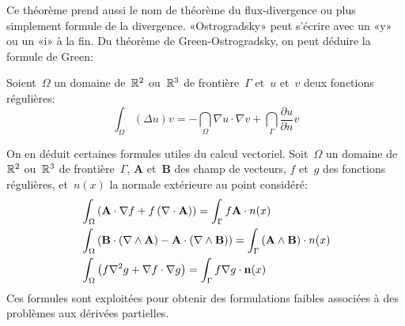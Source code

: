 \medskip
Ce théorème prend aussi le nom de théorème du flux-divergence ou plus simplement formule de la
divergence. «Ostrogradsky» peut s'écrire avec un «y» ou un «i» à la fin. Du théorème de Green-Ostrogradsky, on peut déduire la formule de Green:

\begin{theoreme}
Soient~$\Omega$ un domaine de~$\mathbb R^2$ ou~$\mathbb R^3$ de frontière~$\Gamma$
et~$u$ et~$v$ deux fonctions régulières:
\begin{equation}
\int_\Omega (\Delta u)v = -\dint_\Omega \nabla u\cdot\nabla v + \dint_\Gamma \dfrac{\partial u}{\partial n}v
\end{equation}
\end{theoreme}

\medskip
On en déduit certaines formules utiles du calcul vectoriel.
Soit~$\Omega$ un domaine de~$\mathbb R^2$ ou~$\mathbb R^3$ de frontière~$\Gamma$,
$\mathbf{A}$ et~$\mathbf{B}$ des champ de vecteurs, $f$ et~$g$ des
fonctions régulières, et~$n(x)$ la normale extérieure au point considéré:
\begin{align}
  &\int_\Omega \left( \mathbf{A}\cdot \nabla f + f \left(\nabla \cdot \mathbf{A}\right)\right)=
  \int_\Gamma f \mathbf{A}\cdot n(x)\\
&\int_\Omega \left( \mathbf{B}\cdot\left(\nabla \wedge \mathbf{A}\right) - \mathbf{A}\cdot \left(\nabla
\wedge \mathbf{B}\right) \right)
= \int_\Gamma \left(\mathbf{A} \wedge \mathbf{B}\right)\cdot n(x)\\
&\int_\Omega \left( f \nabla^{2} g + \nabla f \cdot \nabla g \right)
= \int_\Gamma f \nabla g \cdot \mathbf{n}(x)
\end{align}
Ces formules sont exploitées pour obtenir des formulations faibles associées à des problèmes aux dérivées partielles. 
